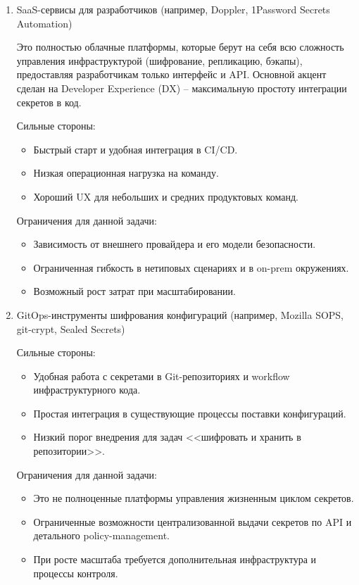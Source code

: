 \documentclass[14pt, a4paper]{extarticle}
\begin{document}
\begin{enumerate}
	\item SaaS-сервисы для разработчиков (например, Doppler, 1Password Secrets Automation)
	
	Это полностью облачные платформы, которые берут на себя всю сложность управления инфраструктурой (шифрование, репликацию, бэкапы), предоставляя разработчикам только интерфейс и API. Основной акцент сделан на Developer Experience (DX) -- максимальную простоту интеграции секретов в код.
	
	Сильные стороны:
	
	\begin{itemize}
	\item Быстрый старт и удобная интеграция в CI/CD.
	\item Низкая операционная нагрузка на команду.
	\item Хороший UX для небольших и средних продуктовых команд.
	\end{itemize}
	
	Ограничения для данной задачи:
	
	\begin{itemize}
	\item Зависимость от внешнего провайдера и его модели безопасности.
	\item Ограниченная гибкость в нетиповых сценариях и в on-prem окружениях.
	\item Возможный рост затрат при масштабировании.
	\end{itemize}
	
	\item GitOps-инструменты шифрования конфигураций (например, Mozilla SOPS, git-crypt, Sealed Secrets)
	
	Сильные стороны:
	
	\begin{itemize}
	\item Удобная работа с секретами в Git-репозиториях и workflow инфраструктурного кода.
	\item Простая интеграция в существующие процессы поставки конфигураций.
	\item Низкий порог внедрения для задач <<шифровать и хранить в репозитории>>.
	\end{itemize}
	
	Ограничения для данной задачи:
	
	\begin{itemize}
	\item Это не полноценные платформы управления жизненным циклом секретов.
	\item Ограниченные возможности централизованной выдачи секретов по API и детального policy-management.
	\item При росте масштаба требуется дополнительная инфраструктура и процессы контроля.
	\end{itemize}
	
	\end{enumerate}
		
\end{document}

